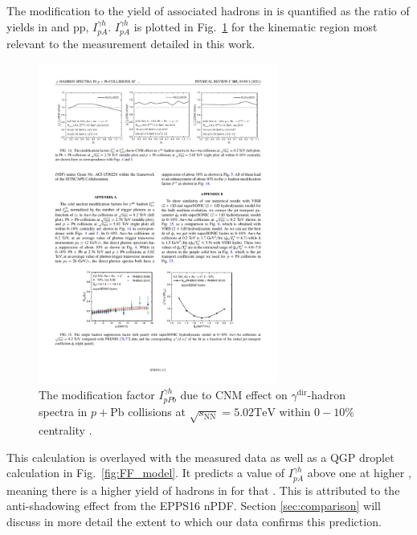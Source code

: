 The modification to the yield of associated hadrons in \pPb is quantified as the ratio of yields in \pPb and pp, $I_{pA}^{\gamma h}$. $I_{pA}^{\gamma h}$ is plotted in Fig.~\ref{fig:cnm_Iaa} for the kinematic region most relevant to the measurement detailed in this work.
\begin{figure}[htpb]
  \centering
  \includegraphics[width=0.7\textwidth]{cnm_Iaa}
  \caption{The modification factor $I_{p P b}^{\gamma h}$ due to CNM effect on $\gamma^{\text {dir}}$-hadron spectra in $p+\mathrm{Pb}$ collisions at $\sqrt{s_{\mathrm{NN}}}=5.02 \mathrm{TeV}$ within $0-10 \%$ centrality \cite{Xie2021}.}
  \label{fig:cnm_Iaa}
\end{figure} 

This calculation is overlayed with the measured data as well as a QGP droplet calculation in Fig.~\ref{fig:FF_model}. It predicts a value of $I_{pA}^{\gamma h}$ above one at higher \zt, meaning there is a higher yield of hadrons in \pPb for that \zt. This is attributed to the anti-shadowing effect from the EPPS16 nPDF. Section \ref{sec:comparison} will discuss in more detail the extent to which our data confirms this prediction. 

